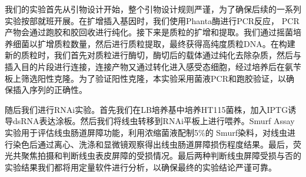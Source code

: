 我们的实验首先从引物设计开始，整个引物设计规则严谨，为了确保后续的一系列实验按部就班开展。在扩增插入基因时，我们使用Phanta酶进行PCR反应， PCR产物会通过跑胶和胶回收进行纯化。接下来是质粒的扩增和提取。我们通过摇菌培养细菌以扩增质粒数量，然后进行质粒提取，最终获得高纯度质粒DNA。在构建新的质粒时，我们首先对质粒进行酶切，酶切后的载体通过纯化去除杂质，然后与插入目的片段进行连接，连接产物又通过转化进入感受态细胞，经过培养后在氨苄板上筛选阳性克隆。为了验证阳性克隆，本实验采用菌液PCR和跑胶验证，以确保插入序列的正确性。

随后我们进行RNAi实验。首先我们在LB培养基中培养HT115菌株，加入IPTG诱导dsRNA表达涂板。然后我们将线虫转移到RNAi平板上进行喂养。Smurf Assay实验用于评估线虫肠道屏障功能，利用浓缩菌液配制5\%的 Smurf染料，对线虫进行染色后通过离心、洗涤和显微镜观察得出线虫肠道屏障损伤程度结果。最后，荧光共聚焦拍摄和判断线虫表皮屏障的受损情况。最后两种判断线虫屏障受损与否的实验结果我们都将用定量软件进行分析，以确保最终的实验结论严谨可靠。
